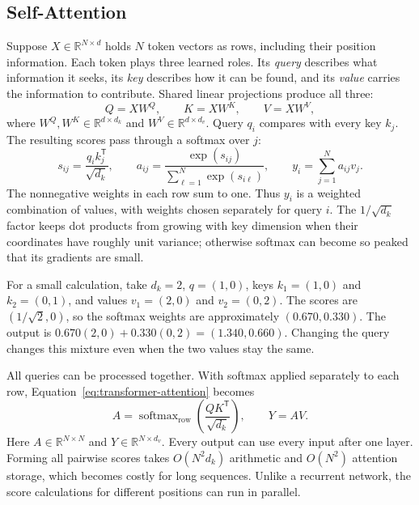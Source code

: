 \subsection{Self-Attention}

Suppose $X\in\mathbb R^{N\times d}$ holds $N$ token vectors as rows, including
their position information. Each token plays three learned roles. Its
\emph{query} describes what information it seeks, its \emph{key} describes how
it can be found, and its \emph{value} carries the information to contribute.
Shared linear projections produce all three:
\begin{equation}
  Q=XW^Q,\qquad K=XW^K,\qquad V=XW^V,
  \label{eq:transformer-qkv}
\end{equation}
\noindent
where $W^Q,W^K\in\mathbb R^{d\times d_k}$ and
$W^V\in\mathbb R^{d\times d_v}$. Query $q_i$ compares with every key $k_j$.
The resulting scores pass through a softmax over $j$:
\begin{equation}
  s_{ij}=\frac{q_i k_j^{\mathsf T}}{\sqrt{d_k}},\qquad
  a_{ij}=\frac{\exp(s_{ij})}{\sum_{\ell=1}^{N}\exp(s_{i\ell})},\qquad
  y_i=\sum_{j=1}^{N}a_{ij}v_j.
  \label{eq:transformer-attention}
\end{equation}
\noindent
The nonnegative weights in each row sum to one. Thus $y_i$ is a weighted
combination of values, with weights chosen separately for query $i$. The
$1/\sqrt{d_k}$ factor keeps dot products from growing with key dimension when
their coordinates have roughly unit variance; otherwise softmax can become so
peaked that its gradients are small.

For a small calculation, take $d_k=2$, $q=(1,0)$, keys $k_1=(1,0)$ and
$k_2=(0,1)$, and values $v_1=(2,0)$ and $v_2=(0,2)$. The scores are
$(1/\sqrt{2},0)$, so the softmax weights are approximately $(0.670,0.330)$.
The output is $0.670(2,0)+0.330(0,2)=(1.340,0.660)$. Changing the query
changes this mixture even when the two values stay the same.

All queries can be processed together. With softmax applied separately to each
row, Equation~\ref{eq:transformer-attention} becomes
\begin{equation}
  A=\operatorname{softmax}_{\mathrm{row}}\!\left(
      \frac{QK^{\mathsf T}}{\sqrt{d_k}}\right),\qquad
  Y=AV.
  \label{eq:transformer-matrix-attention}
\end{equation}
\noindent
Here $A\in\mathbb R^{N\times N}$ and $Y\in\mathbb R^{N\times d_v}$.
Every output can use every input after one layer. Forming all pairwise scores
takes $O(N^2d_k)$ arithmetic and $O(N^2)$ attention storage, which becomes
costly for long sequences. Unlike a recurrent network, the score calculations
for different positions can run in parallel.

